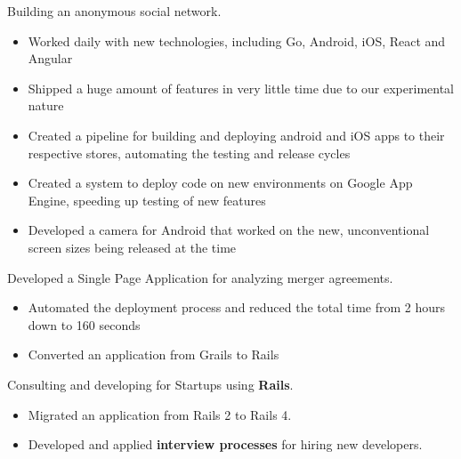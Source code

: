 \documentclass[10pt,a4paper,ragged2e,withhyper]{altacv}
\newcommand{\accentbold}[1]{\textbf{\textcolor{accent}{#1}}}
\begin{document}
\begin{paracol}{2}
\divider


{\RaggedRight
Building an anonymous social network.

\medskip

\begin{itemize}
\item Worked daily with new technologies, including Go, Android, iOS, React and Angular
\item Shipped a huge amount of features in very little time due to our experimental nature
\item Created a pipeline for building and deploying android and iOS apps to their respective stores, automating the testing and release cycles
\item Created a system to deploy code on new environments on Google App Engine, speeding up testing of new features
\item Developed a camera for Android that worked on the new, unconventional screen sizes being released at the time
\end{itemize}
}

\divider


{\RaggedRight
Developed a Single Page Application for analyzing merger agreements.

\medskip

\begin{itemize}
\item Automated the deployment process and reduced the total time from 2 hours down to 160 seconds
\item Converted an application from Grails to Rails
\end{itemize}
}

\divider


{\RaggedRight
Consulting and developing for Startups using \accentbold{Rails}.

\medskip

\begin{itemize}
\item Migrated an application from Rails 2 to Rails 4.
\item Developed and applied \accentbold{interview processes} for hiring new developers.
\end{itemize}
}


\end{paracol}
\end{document}
